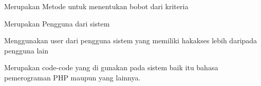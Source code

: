 Merupakan Metode untuk menentukan bobot dari kriteria

Merupakan Pengguna dari sistem

Menggunakan user dari pengguna sistem yang memiliki hakakses lebih daripada pengguna lain

Merupakan code-code yang di gunakan pada sistem baik itu bahasa pemerograman PHP maupun yang lainnya.